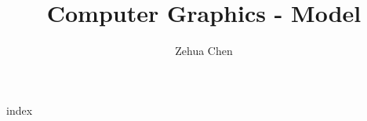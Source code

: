 \documentclass[letterpaper, 11pt]{report}
\title{Computer Graphics - Model}
\author{Zehua Chen}
\begin{document}
  \maketitle
  \tableofcontents

  {index}
\end{document}
